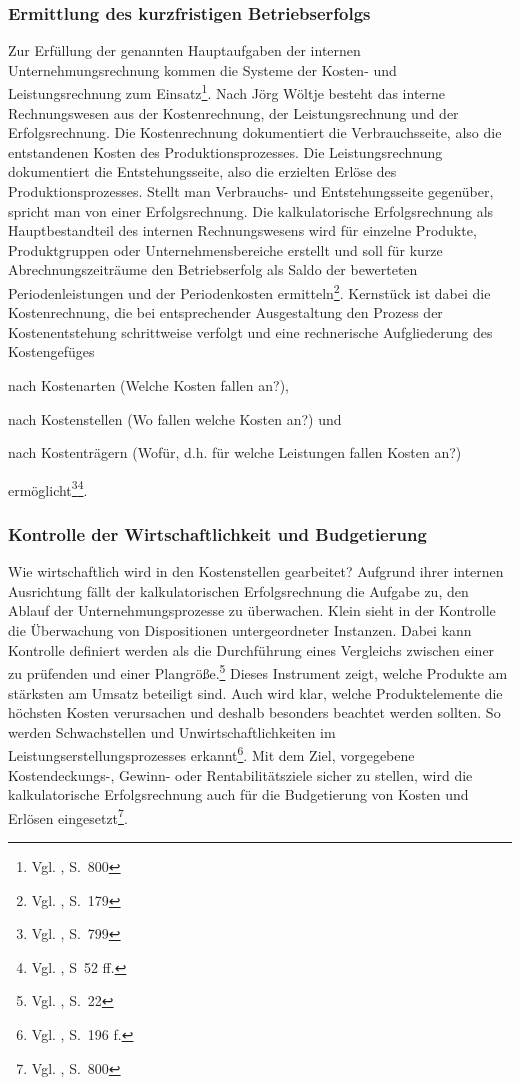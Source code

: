 \subsubsection{Ermittlung des kurzfristigen Betriebserfolgs}
Zur Erfüllung der genannten Hauptaufgaben der internen Unternehmungsrechnung kommen die Systeme der Kosten- und Leistungsrechnung zum Einsatz\footnote{Vgl. \cite{Schierenbeck2008}, S.~800}. Nach Jörg Wöltje besteht das interne Rechnungswesen aus der Kostenrechnung, der Leistungsrechnung und der Erfolgsrechnung. Die Kostenrechnung dokumentiert die Verbrauchsseite, also die entstandenen Kosten des Produktionsprozesses. Die Leistungsrechnung dokumentiert die Entstehungsseite, also die erzielten Erlöse des Produktionsprozesses. Stellt man Verbrauchs- und Entstehungsseite gegenüber, spricht man von einer Erfolgsrechnung. Die kalkulatorische Erfolgsrechnung als Hauptbestandteil des internen Rechnungswesens wird für einzelne Produkte, Produktgruppen oder Unternehmensbereiche erstellt und soll für kurze Abrechnungszeiträume den Betriebserfolg als Saldo der bewerteten Periodenleistungen und der Periodenkosten ermitteln\footnote{Vgl. \cite{Woltje2008}, S.~179}.
Kernstück ist dabei die Kostenrechnung, die bei entsprechender Ausgestaltung den Prozess der Kostenentstehung schrittweise verfolgt und eine rechnerische Aufgliederung des Kostengefüges 
\begin{compactitem}
\item nach Kostenarten (Welche Kosten fallen an?), 
\item nach Kostenstellen (Wo fallen welche Kosten an?) und 
\item nach Kostenträgern (Wofür, d.h. für welche Leistungen fallen Kosten an?)
\end{compactitem} ermöglicht\footnote{Vgl. \cite{Schierenbeck2008}, S.~799}\footnote{Vgl. \cite{Ossadnik2008}, S~52 ff.}.


\subsubsection{Kontrolle der Wirtschaftlichkeit und Budgetierung}
Wie wirtschaftlich wird in den Kostenstellen gearbeitet?
Aufgrund ihrer internen Ausrichtung fällt der kalkulatorischen Erfolgsrechnung die Aufgabe zu, den Ablauf der Unternehmungsprozesse zu überwachen. Klein sieht in der Kontrolle die Überwachung von Dispositionen untergeordneter Instanzen. Dabei kann Kontrolle definiert werden als die \glqq Durchführung eines Vergleichs zwischen einer zu prüfenden und einer Plangröße.\grqq \footnote{Vgl. \cite{Klein1999}, S.~22}
Dieses Instrument zeigt, welche Produkte am stärksten am Umsatz beteiligt sind. Auch wird klar, welche Produktelemente die höchsten Kosten verursachen und deshalb besonders beachtet werden sollten. So werden Schwachstellen und Unwirtschaftlichkeiten im Leistungserstellungsprozesses erkannt\footnote{Vgl. \cite{Woltje2008}, S.~196 f.}. Mit dem Ziel, vorgegebene Kostendeckungs-, Gewinn- oder Rentabilitätsziele sicher zu stellen, wird die kalkulatorische Erfolgsrechnung auch für die Budgetierung von Kosten und Erlösen eingesetzt\footnote{Vgl. \cite{Schierenbeck2008}, S.~800}.

